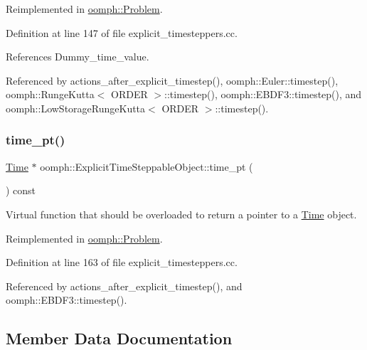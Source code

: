 Reimplemented in \hyperlink{classoomph_1_1Problem_acd8c357349d20a28af70b2b7ea7f488d}{oomph\+::\+Problem}.



Definition at line 147 of file explicit\+\_\+timesteppers.\+cc.



References Dummy\+\_\+time\+\_\+value.



Referenced by actions\+\_\+after\+\_\+explicit\+\_\+timestep(), oomph\+::\+Euler\+::timestep(), oomph\+::\+Runge\+Kutta$<$ O\+R\+D\+E\+R $>$\+::timestep(), oomph\+::\+E\+B\+D\+F3\+::timestep(), and oomph\+::\+Low\+Storage\+Runge\+Kutta$<$ O\+R\+D\+E\+R $>$\+::timestep().

\mbox{\label{classoomph_1_1ExplicitTimeSteppableObject_a49ecd5e667dc16d4f2b991598d311b36}} 
\subsubsection{\texorpdfstring{time\+\_\+pt()}{time\_pt()}}
{\footnotesize\ttfamily \hyperlink{classoomph_1_1Time}{Time} $\ast$ oomph\+::\+Explicit\+Time\+Steppable\+Object\+::time\+\_\+pt (\begin{DoxyParamCaption}{ }\end{DoxyParamCaption}) const\hspace{0.3cm}{\ttfamily [virtual]}}



Virtual function that should be overloaded to return a pointer to a \hyperlink{classoomph_1_1Time}{Time} object. 



Reimplemented in \hyperlink{classoomph_1_1Problem_aa86b09eac493cfa9fcbe57734985ba19}{oomph\+::\+Problem}.



Definition at line 163 of file explicit\+\_\+timesteppers.\+cc.



Referenced by actions\+\_\+after\+\_\+explicit\+\_\+timestep(), and oomph\+::\+E\+B\+D\+F3\+::timestep().



\subsection{Member Data Documentation}
\mbox{\label{classoomph_1_1ExplicitTimeSteppableObject_ae16e2f717ed0e72c2c543745f8716252}} 
